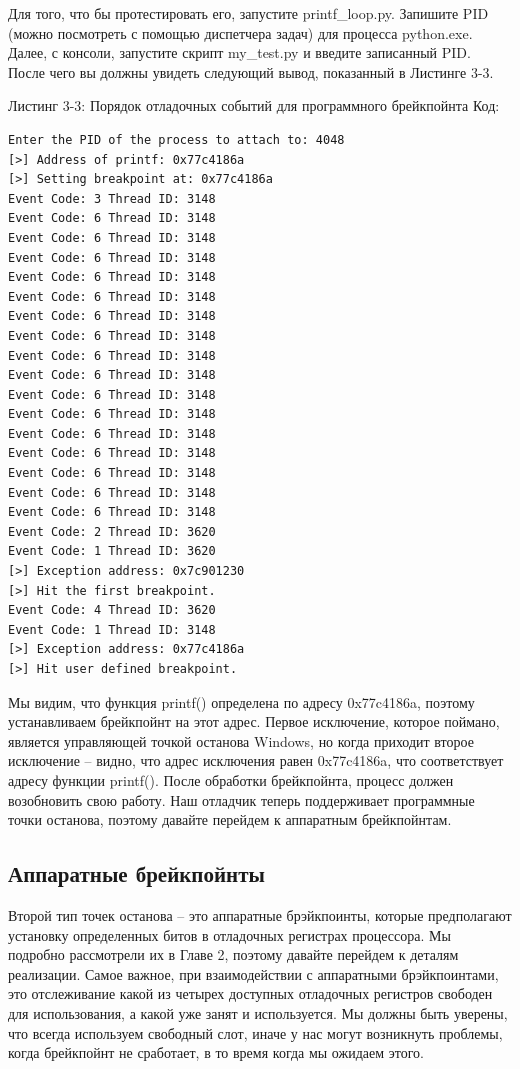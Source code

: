 \documentclass[12pt, a4paper, oneside]{book}
\begin{document}
Для того, что бы протестировать его, запустите printf\_loop.py. Запишите PID (можно посмотреть с помощью диспетчера задач) для процесса python.exe. Далее, с консоли, запустите скрипт my\_test.py и введите записанный PID. После чего вы должны увидеть следующий вывод, показанный в Листинге 3-3.

Листинг 3-3: Порядок отладочных событий для программного брейкпойнта
Код:
\begin{verbatim}
Enter the PID of the process to attach to: 4048
[>] Address of printf: 0x77c4186a
[>] Setting breakpoint at: 0x77c4186a
Event Code: 3 Thread ID: 3148
Event Code: 6 Thread ID: 3148
Event Code: 6 Thread ID: 3148
Event Code: 6 Thread ID: 3148
Event Code: 6 Thread ID: 3148
Event Code: 6 Thread ID: 3148
Event Code: 6 Thread ID: 3148
Event Code: 6 Thread ID: 3148
Event Code: 6 Thread ID: 3148
Event Code: 6 Thread ID: 3148
Event Code: 6 Thread ID: 3148
Event Code: 6 Thread ID: 3148
Event Code: 6 Thread ID: 3148
Event Code: 6 Thread ID: 3148
Event Code: 6 Thread ID: 3148
Event Code: 6 Thread ID: 3148
Event Code: 6 Thread ID: 3148
Event Code: 2 Thread ID: 3620
Event Code: 1 Thread ID: 3620
[>] Exception address: 0x7c901230
[>] Hit the first breakpoint.
Event Code: 4 Thread ID: 3620
Event Code: 1 Thread ID: 3148
[>] Exception address: 0x77c4186a
[>] Hit user defined breakpoint.
\end{verbatim}

Мы видим, что функция printf() определена по адресу 0x77c4186a, поэтому устанавливаем брейкпойнт на этот адрес. Первое исключение, которое поймано, является управляющей точкой останова Windows, но когда приходит второе исключение – видно, что адрес исключения равен 0x77c4186a, что соответствует адресу функции printf(). После обработки брейкпойнта, процесс должен возобновить свою работу. Наш отладчик теперь поддерживает программные точки останова, поэтому давайте перейдем к аппаратным брейкпойнтам.

\subsection{Аппаратные брейкпойнты}

Второй тип точек останова – это аппаратные брэйкпоинты, которые предполагают установку определенных битов в отладочных регистрах процессора. Мы подробно рассмотрели их в Главе 2, поэтому давайте перейдем к деталям реализации. Самое важное, при взаимодействии с аппаратными брэйкпоинтами, это отслеживание какой из четырех доступных отладочных регистров свободен для использования, а какой уже занят и используется. Мы должны быть уверены, что всегда используем свободный слот, иначе у нас могут возникнуть проблемы, когда брейкпойнт не сработает, в то время когда мы ожидаем этого.
\end{document}
